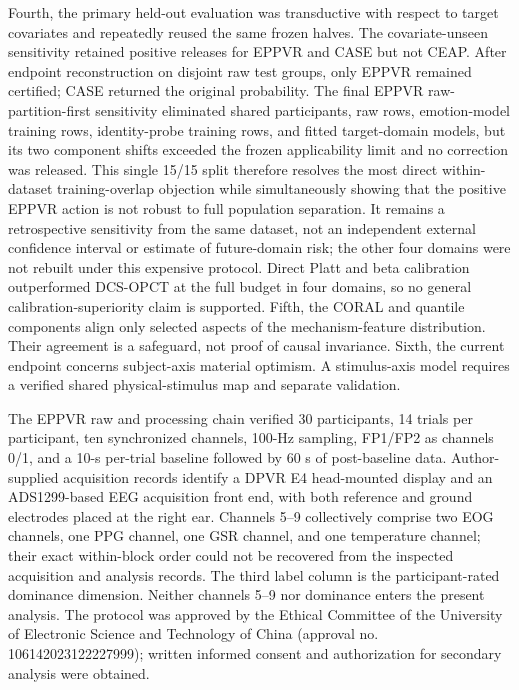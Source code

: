 \documentclass[preprint,12pt]{elsarticle}
\begin{document}
Fourth, the primary held-out evaluation was transductive with respect to target covariates and repeatedly reused the same frozen halves. The covariate-unseen sensitivity retained positive releases for EPPVR and CASE but not CEAP. After endpoint reconstruction on disjoint raw test groups, only EPPVR remained certified; CASE returned the original probability. The final EPPVR raw-partition-first sensitivity eliminated shared participants, raw rows, emotion-model training rows, identity-probe training rows, and fitted target-domain models, but its two component shifts exceeded the frozen applicability limit and no correction was released. This single 15/15 split therefore resolves the most direct within-dataset training-overlap objection while simultaneously showing that the positive EPPVR action is not robust to full population separation. It remains a retrospective sensitivity from the same dataset, not an independent external confidence interval or estimate of future-domain risk; the other four domains were not rebuilt under this expensive protocol. Direct Platt and beta calibration outperformed DCS-OPCT at the full budget in four domains, so no general calibration-superiority claim is supported. Fifth, the CORAL and quantile components align only selected aspects of the mechanism-feature distribution. Their agreement is a safeguard, not proof of causal invariance. Sixth, the current endpoint concerns subject-axis material optimism. A stimulus-axis model requires a verified shared physical-stimulus map and separate validation.

The EPPVR raw and processing chain verified 30 participants, 14 trials per participant, ten synchronized channels, 100-Hz sampling, FP1/FP2 as channels 0/1, and a 10-s per-trial baseline followed by 60 s of post-baseline data. Author-supplied acquisition records identify a DPVR E4 head-mounted display and an ADS1299-based EEG acquisition front end, with both reference and ground electrodes placed at the right ear. Channels 5--9 collectively comprise two EOG channels, one PPG channel, one GSR channel, and one temperature channel; their exact within-block order could not be recovered from the inspected acquisition and analysis records. The third label column is the participant-rated dominance dimension. Neither channels 5--9 nor dominance enters the present analysis. The protocol was approved by the Ethical Committee of the University of Electronic Science and Technology of China (approval no. 106142023122227999); written informed consent and authorization for secondary analysis were obtained.
\end{document}
